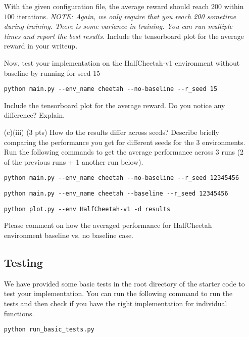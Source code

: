 \documentclass{article}
\begin{document}
\begin{enumerate}
With the given configuration file, the average reward should reach $200$ within $100$ iterations. \emph{NOTE: Again, we only require that you reach 200 sometime during training. There is some variance in training. You can run multiple times and report the best results.} Include the tensorboard plot for the average reward in your writeup.

Now, test your implementation on the HalfCheetah-v1 environment without baseline by running for seed 15
\begin{tcolorbox}
\begin{verbatim}
python main.py --env_name cheetah --no-baseline --r_seed 15
\end{verbatim}
\end{tcolorbox}
Include the tensorboard plot for the average reward. Do you notice any difference? Explain.

\item[(c)(iii) (3 pts)] How do the results differ across seeds? Describe briefly comparing the performance you get for different seeds for the 3 environments. Run the following commands to get the average performance across 3 runs (2 of the previous runs + 1 another run below).

\begin{tcolorbox}
\begin{verbatim}
python main.py --env_name cheetah --no-baseline --r_seed 12345456
\end{verbatim}
\end{tcolorbox}

\begin{tcolorbox}
\begin{verbatim}
python main.py --env_name cheetah --baseline --r_seed 12345456
\end{verbatim}
\end{tcolorbox}

\begin{tcolorbox}
\begin{verbatim}
python plot.py --env HalfCheetah-v1 -d results
\end{verbatim}
\end{tcolorbox}

Please comment on how the averaged performance for HalfCheetah environment  baseline vs. no baseline case.

\subsection{Testing}
We have provided some basic tests in the root directory of the starter code to test your implementation. You can run the following command to run the tests and then check if you have the right implementation for individual functions.

\begin{tcolorbox}
\begin{verbatim}
python run_basic_tests.py
\end{verbatim}
\end{tcolorbox}

\end{enumerate}
\end{document}
